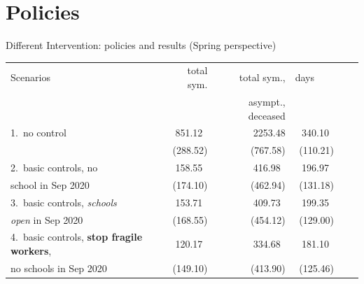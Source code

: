 \documentclass[8pt]{beamer}
\begin{document}
\section{Policies}


\begin{frame}{Different Intervention: policies and results (Spring perspective)}

\begin{table}[H]
\center
\footnotesize
\begin{tabular}{lrrrrr}
\toprule
Scenarios                              &  total sym.  & total sym.,       & days~~~~  \\
{}                                           &                    & asympt., deceased   \\                               
\midrule
1.~no control                       &  {\color{red}851.12}~     &  {\color{red}2253.48}         &  340.10~  \\
                                            &  (288.52)    &  (767.58)         &  (110.21) \\
\midrule
2.~basic controls, no           &   {\color{blue}158.55}~    &  {\color{blue}416.98}~         &  196.97~  \\
 school in Sep 2020            &   (174.10)     &  (462.94)        &  (131.18) \\
\midrule
3.~basic controls, \emph{schools}   &   {\color{blue}153.71}~    &       {\color{blue}409.73}~       &  199.35~  \\
 \emph{open} in Sep 2020                &  (168.55)   &     (454.12)        &  (129.00) \\
\midrule
4.~basic controls, \textbf{stop  fragile workers},   &   {\color{orange}120.17}~   &      {\color{orange}334.68}~         &  181.10~   \\
 no  schools in Sep 2020                          &   (149.10)  &     (413.90)         &   (125.46) \\
\midrule

\end{tabular}
\end{table}
\end{frame}
\end{document}
